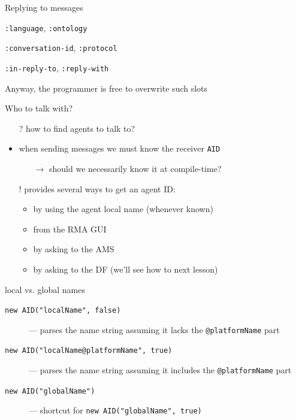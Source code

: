 \documentclass{beamer}\mode<presentation>{\usetheme{AMSCesenaPurpleAndGold}}
\begin{document}
\begin{frame}[c,allowframebreaks]
\begin{block}{Replying to messages}
\begin{itemize}
\begin{small}
                \item \texttt{:language}, \texttt{:ontology}
                \item \texttt{:conversation-id}, \texttt{:protocol}
                \item \texttt{:in-reply-to}, \texttt{:reply-with}
        \end{small}\end{itemize}
        Anyway, the programmer is free to overwrite such slots
    \end{block}
    \begin{block}{Who to talk with?}
        \begin{itemize}
            \item[?] how to find agents to talk to?
            \item when sending messages we must know the receiver \texttt{AID}
            \begin{itemize}
                \item[$\rightarrow$] should we necessarily know it at compile-time?
            \end{itemize}
            \item[!] \jade{} provides several ways to get an agent ID:
            \begin{itemize}
                \item by using the agent \alert{local name} (whenever known)
                \item from the RMA GUI
                \item by asking to the AMS
                \item by asking to the DF (we'll see how to next lesson)
            \end{itemize}
        \end{itemize}
    \end{block}
    \begin{block}{\jade{} local vs. global names}
        \begin{description}
        	\item[\texttt{new AID("localName", \alert{false})}] --- parses the name string assuming it lacks the \texttt{@platformName} part
        	\item[\texttt{new AID("localName@platformName", \alert{true})}] --- parses the name string assuming it includes the \texttt{@platformName} part
    	    \item[\texttt{new AID("globalName")}] --- shortcut for \texttt{new AID("globalName", \alert{true})}

\end{description}
\end{block}
\end{frame}
\end{document}
